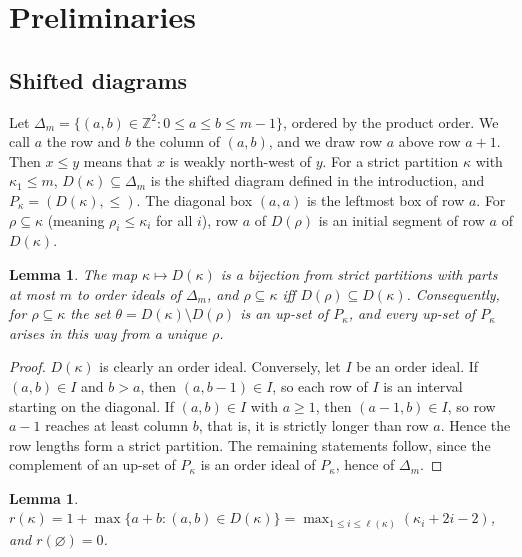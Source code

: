 \documentclass[11pt]{amsart}
\newtheorem{lemma}[theorem]{Lemma}
\theoremstyle{definition}
\theoremstyle{remark}
\newcommand{\Z}{\mathbb{Z}}
\begin{document}
\section{Preliminaries}\label{sec:prelim}

\subsection{Shifted diagrams}\label{ssec:shifted}
Let $\Delta_m=\{(a,b)\in\Z^2:0\le a\le b\le m-1\}$, ordered by the product order. We call $a$
the row and $b$ the column of $(a,b)$, and we draw row $a$ above row $a+1$. Then
$x\le y$ means that $x$ is weakly north-west of $y$. For a strict partition $\kappa$ with
$\kappa_1\le m$, $D(\kappa)\subseteq\Delta_m$ is the shifted diagram defined in the
introduction, and $P_\kappa=(D(\kappa),\le)$. The diagonal box $(a,a)$ is the leftmost box of
row $a$. For $\rho\subseteq\kappa$ (meaning $\rho_i\le\kappa_i$ for all $i$), row $a$ of
$D(\rho)$ is an initial segment of row $a$ of $D(\kappa)$.

\begin{lemma}\label{lem:ideals}
The map $\kappa\mapsto D(\kappa)$ is a bijection from strict partitions with parts at most
$m$ to order ideals of $\Delta_m$, and $\rho\subseteq\kappa$ iff $D(\rho)\subseteq D(\kappa)$.
Consequently, for $\rho\subseteq\kappa$ the set $\theta=D(\kappa)\setminus D(\rho)$ is an
up-set of $P_\kappa$, and every up-set of $P_\kappa$ arises in this way from a unique $\rho$.
\end{lemma}

\begin{proof}
$D(\kappa)$ is clearly an order ideal. Conversely, let $I$ be an order ideal. If
$(a,b)\in I$ and $b>a$, then $(a,b-1)\in I$, so each row of $I$ is an interval starting on
the diagonal. If $(a,b)\in I$ with $a\ge1$, then $(a-1,b)\in I$, so row $a-1$ reaches at
least column $b$, that is, it is strictly longer than row $a$. Hence the row lengths form a
strict partition. The remaining statements follow, since the complement of an up-set of
$P_\kappa$ is an order ideal of $P_\kappa$, hence of $\Delta_m$.
\end{proof}

\begin{lemma}\label{lem:chain}
$r(\kappa)=1+\max\{a+b:(a,b)\in D(\kappa)\}=\max_{1\le i\le\ell(\kappa)}(\kappa_i+2i-2)$, and
$r(\varnothing)=0$.
\end{lemma}
\end{document}
